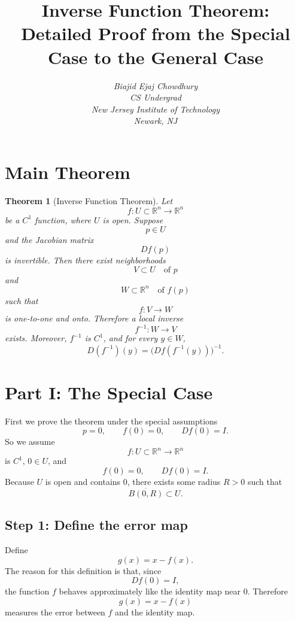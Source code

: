 \documentclass[11pt]{article}
\newtheorem{theorem}{Theorem}
\begin{document}
\title{Inverse Function Theorem: Detailed Proof from the Special Case to the General Case}
\author{
\textit{Biajid Ejaj Chowdhury}\\[6pt]
\textit{CS Undergrad}\\[4pt]
\textit{New Jersey Institute of Technology}\\[4pt]
\textit{Newark, NJ}\\
}
\date{}
\maketitle

\section*{Main Theorem}

\begin{theorem}[Inverse Function Theorem]
Let
\[
f:U\subset \mathbb R^n\to \mathbb R^n
\]
be a $C^1$ function, where $U$ is open. Suppose
\[
p\in U
\]
and the Jacobian matrix
\[
Df(p)
\]
is invertible. Then there exist neighborhoods
\[
V\subset U \quad \text{of }p
\]
and
\[
W\subset \mathbb R^n \quad \text{of } f(p)
\]
such that
\[
f:V\to W
\]
is one-to-one and onto. Therefore a local inverse
\[
f^{-1}:W\to V
\]
exists. Moreover, $f^{-1}$ is $C^1$, and for every $y\in W$,
\[
D(f^{-1})(y)=\bigl(Df(f^{-1}(y))\bigr)^{-1}.
\]
\end{theorem}

\section*{Part I: The Special Case}

First we prove the theorem under the special assumptions
\[
p=0,\qquad f(0)=0,\qquad Df(0)=I.
\]
So we assume
\[
f:U\subset \mathbb R^n\to \mathbb R^n
\]
is $C^1$, $0\in U$, and
\[
f(0)=0,\qquad Df(0)=I.
\]
Because $U$ is open and contains $0$, there exists some radius $R>0$ such that
\[
\overline{B(0,R)}\subset U.
\]

\subsection*{Step 1: Define the error map}

Define
\[
g(x)=x-f(x).
\]
The reason for this definition is that, since
\[
Df(0)=I,
\]
the function $f$ behaves approximately like the identity map near $0$. Therefore
\[
g(x)=x-f(x)
\]
measures the error between $f$ and the identity map.
\end{document}

